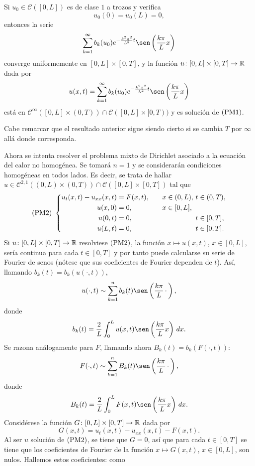 \documentclass[a4paper, 12pt, extrafontsizes]{memoir}
\begin{document}
\begin{theorem}
    Si $u_0 \in \mathcal{C}([0,L])$ es de clase $1$ a trozos y verifica
    \[u_0(0) = u_0(L) = 0,\]
    entonces la serie 
    \[\sum_{k=1}^\infty b_k(u_0)e^{-\frac{k^2\pi^2}{L^2}t}\sen\left(\frac{k\pi}{L}x\right)\]
    converge uniformemente en $[0,L] \times [0,T]$, y la función $u \colon [0,L] \times [0,T] \to \mathbb R$ dada por
    \[u(x,t) = \sum_{k=1}^\infty b_k(u_0)e^{-\frac{k^2\pi^2}{L^2}t}\sen\left(\frac{k\pi}{L}x\right)\]
    está en $\mathcal{C}^\infty([0,L] \times (0,T)) \cap \mathcal{C}([0,L] \times [0,T))$ y es solución de $\textup{(PM1)}$.
\end{theorem}

Cabe remarcar que el resultado anterior sigue siendo cierto si se cambia $T$ por $\infty$ allá donde corresponda.

Ahora se intenta resolver el problema mixto de Dirichlet asociado a la ecuación del calor no homogénea. Se tomará $n=1$ y se considerarán condiciones homogéneas en todos lados. Es decir, se trata de hallar $u \in \mathcal{C}^{2,1}((0,L) \times (0,T)) \cap \mathcal{C}([0,L] \times [0,T])$ tal que
\[
    \textup{(PM2)} \ \left\{\begin{alignedat}{5}
        u_{t}(x,t)-u_{xx}(x,t) &= F(x,t), \qquad & x &\in (0,L), \ & t &\in (0,T), \\
        u(x,0) &= 0, \qquad & x &\in [0,L], & & \\
        u(0,t) &= 0, \qquad & & & t &\in [0,T], \\
        u(L,t) &= 0, \qquad & & & t &\in [0,T]. \\
    \end{alignedat}\right.
\]
Si $u \colon [0,L] \times [0,T] \to \mathbb R$ resolviese $\textup{(PM2)}$, la función $x \mapsto u(x,t)$, $x \in [0,L]$, sería continua para cada $t \in [0,T]$ y por tanto puede calcularse su serie de Fourier de senos (nótese que sus coeficientes de Fourier dependen de $t$). Así, llamando $b_k(t) = b_k(u(\cdot,t))$,
\[u(\cdot,t) \sim \sum_{k=1}^n b_k(t)\sen\left(\frac{k\pi}{L}\, \cdot \,\right),\]
donde
\[b_k(t) = \frac{2}{L}\int_{0}^L u(x,t)\sen\left(\frac{k\pi}{L}x\right) \, dx.\]
Se razona análogamente para $F$, llamando ahora $B_k(t) = b_k(F(\cdot,t))$:
\[F(\cdot,t) \sim \sum_{k=1}^n B_k(t)\sen\left(\frac{k\pi}{L}\, \cdot \,\right),\]
donde
\[B_k(t) = \frac{2}{L}\int_{0}^L F(x,t)\sen\left(\frac{k\pi}{L}x\right) \, dx.\]
Considérese la función $G \colon [0,L] \times [0,T] \to \mathbb R$ dada por
\[G(x,t) = u_t(x,t)-u_{xx}(x,t) - F(x,t).\]
Al ser $u$ solución de $\textup{(PM2)}$, se tiene que $ G = 0$, así que para cada $t\in[0,T]$ se tiene que los coeficientes de Fourier de la función $x \mapsto G(x,t)$, $x \in [0,L]$, son nulos. Hallemos estos coeficientes: como
\end{document}
